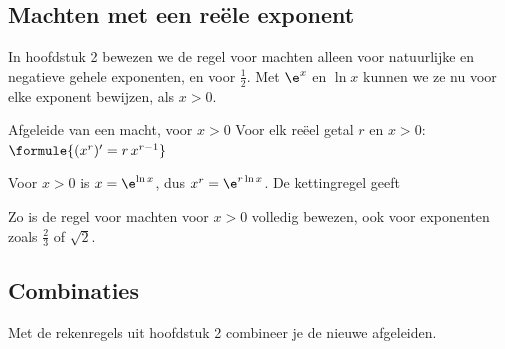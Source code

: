 \subsection{Machten met een reële exponent}

In hoofdstuk 2 bewezen we de regel voor machten alleen voor natuurlijke en negatieve gehele exponenten, en voor $\frac12$. Met $\e^x$ en $\ln x$ kunnen we ze nu voor elke exponent bewijzen, als $x > 0$.

\begin{theorie}
\begin{stelling}{Afgeleide van een macht, voor \texorpdfstring{$x > 0$}{x > 0}}
Voor elk reëel getal $r$ en $x > 0$: \quad $\formule{(x^r)' = r\,x^{r - 1}}$
\end{stelling}
\begin{bewijs}
Voor $x > 0$ is $x = \e^{\ln x}$, dus $x^r = \e^{r \ln x}$. De kettingregel geeft
\end{bewijs}
\end{theorie}

Zo is de regel voor machten voor $x > 0$ volledig bewezen, ook voor exponenten zoals $\frac23$ of $\sqrt2$.

\subsection{Combinaties}

Met de rekenregels uit hoofdstuk 2 combineer je de nieuwe afgeleiden.



